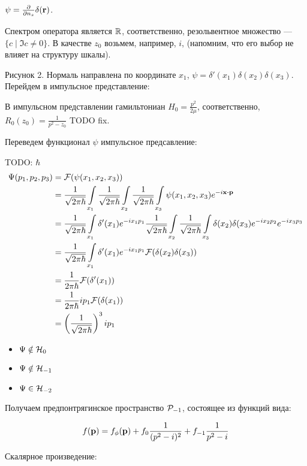 $\psi = \pdv{n_s} \delta(\vb{r})$.

Спектром оператора является $\mathbb{R}$, соответственно, резольвентное множество — $\{ c \mid \Im c \ne 0 \}$. В качестве $z_0$ возьмем, например, $i$, (напомним, что его выбор не влияет на структуру шкалы).


Рисунок 2. Нормаль направлена по координате $x_1$, $\psi = \delta'(x_1) \delta(x_2) \delta(x_3)$. Перейдем в импульсное представление:

В импульсном представлении гамильтониан $H_0 = \frac{p^2}{2 \mu}$, соответственно, $R_0(z_0) = \frac{1}{p^2 - z_0}$ TODO fix.

Переведем функционал $\psi$ импульсное предсавление:

TODO: $\hbar$
\begin{align*}
\Psi(p_1, p_2, p_3)
&= \mathcal{F}(\psi(x_1, x_2, x_3)) \\
&= \frac{1}{\sqrt{2 \pi \hbar}} \int\limits_{x_1} \frac{1}{\sqrt{2 \pi \hbar}} \int\limits_{x_2} \frac{1}{\sqrt{2 \pi \hbar}} \int\limits_{x_3} \psi(x_1, x_2, x_3) e^{-i \vb{x} \vdot \vb{p}} \\
&= \frac{1}{\sqrt{2 \pi \hbar}} \int\limits_{x_1} \delta'(x_1) e^{-i x_1 p_1} \frac{1}{\sqrt{2 \pi \hbar}} \int\limits_{x_2} \frac{1}{\sqrt{2 \pi \hbar}} \int\limits_{x_3} \delta(x_2) \delta(x_3) e^{-i x_2 p_2} e^{-i x_3 p_3} \\
&= \frac{1}{\sqrt{2 \pi \hbar}} \int\limits_{x_1} \delta'(x_1) e^{-i x_1 p_1} \mathcal{F}(\delta(x_2) \delta(x_3)) \\
&= \frac{1}{2 \pi \hbar} \mathcal{F}(\delta'(x_1)) \\
&= \frac{1}{2 \pi \hbar} i p_1 \mathcal{F}(\delta(x_1)) \\
&= \left(\frac{1}{\sqrt{2 \pi \hbar}}\right)^3 i p_1
\end{align*}

\begin{itemize}
\item $\Psi \notin \mathcal{H}_{0}$ 
\item $\Psi \notin \mathcal{H}_{-1}$
\item $\Psi \in \mathcal{H}_{-2}$
\end{itemize}


Получаем предпонтрягинское пространство $\mathcal{P}_{-1}$, состоящее из функций вида:

\[
f(\vb{p}) = f_\phi(\vb{p}) + f_0 \frac{1}{(p^2 - i)^2} + f_{-1} \frac{1}{p^2 - i}
\]

Скалярное произведение:


